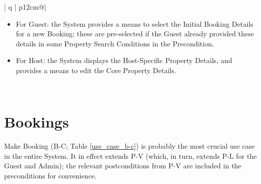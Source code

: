 \begin{table}[H]
\begin{tabular}{| q | p{12cm}@\qquad |}
        \begin{itemize}
            \item For Guest: the System provides a means to select the Initial Booking Details for a new Booking; these are pre-selected if the Guest already provided these details in some Property Search Conditions in the Precondition.
            \item For Host: the System displays the Host-Specific Property Details, and provides a means to edit the Core Property Details.
            \vspace{-0.4cm}
        \end{itemize}
         \\ \hline
    \end{tabular}
    \caption{Use Case P-V: View Property Details}
    \label{use_case_p-v}
  \end{table}

  \restoregeometry

\section{Bookings}

Make Booking (B-C; Table \ref{use_case_b-c}) is probably the most crucial use case in the entire System. It in effect extends P-V (which, in turn, extends P-L for the Guest and Admin); the relevant postconditions from P-V are included in the preconditions for convenience.


